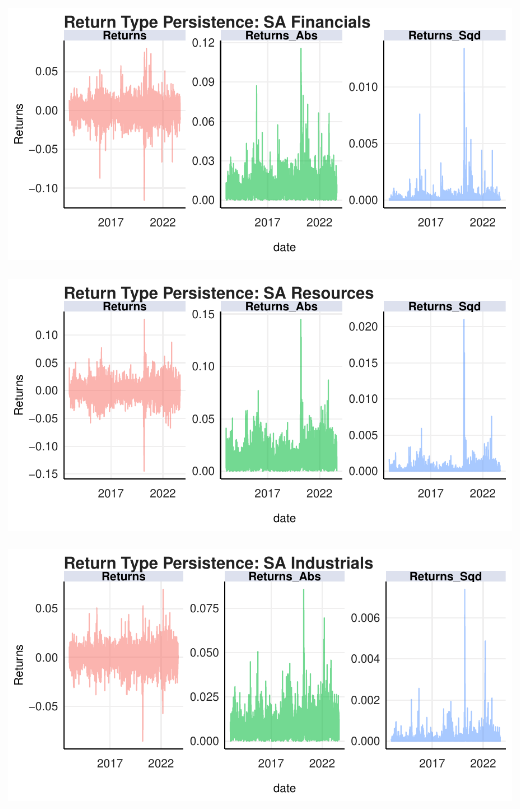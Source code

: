 \documentclass[12pt,preprint, authoryear]{elsarticle}
\let\origfigure\figure
\let\endorigfigure\endfigure
\renewenvironment{figure}[1][2] {
    \expandafter\origfigure\expandafter[H]
} {
    \endorigfigure
}
\numberwithin{equation}{section}
\numberwithin{figure}{section}
\numberwithin{table}{section}
\begin{document}
\begin{figure}[H]

{\centering \includegraphics{WriteUp_files/figure-latex/FigureA1-1} 

}

\caption{Return Persistence: Financials \label{FigureA1}}\label{fig:FigureA1}
\end{figure}

\begin{figure}[H]

{\centering \includegraphics{WriteUp_files/figure-latex/FigureA2-1} 

}

\caption{Return Persistence: Resources \label{FigureA2}}\label{fig:FigureA2}
\end{figure}

\begin{figure}[H]

{\centering \includegraphics{WriteUp_files/figure-latex/FigureA3-1} 

}

\caption{Return Persistence: Industrials \label{FigureA3}}\label{fig:FigureA3}
\end{figure}
\end{document}
